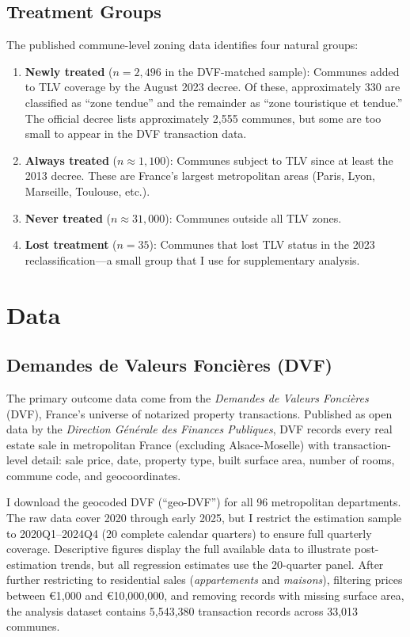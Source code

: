 \documentclass[12pt]{article}
\begin{document}
\subsection{Treatment Groups}

The published commune-level zoning data identifies four natural groups:

\begin{enumerate}
\item \textbf{Newly treated} ($n = 2,496$ in the DVF-matched sample): Communes added to TLV coverage by the August 2023 decree. Of these, approximately 330 are classified as ``zone tendue'' and the remainder as ``zone touristique et tendue.'' The official decree lists approximately 2,555 communes, but some are too small to appear in the DVF transaction data.
\item \textbf{Always treated} ($n \approx 1,100$): Communes subject to TLV since at least the 2013 decree. These are France's largest metropolitan areas (Paris, Lyon, Marseille, Toulouse, etc.).
\item \textbf{Never treated} ($n \approx 31,000$): Communes outside all TLV zones.
\item \textbf{Lost treatment} ($n = 35$): Communes that lost TLV status in the 2023 reclassification---a small group that I use for supplementary analysis.
\end{enumerate}


\section{Data}\label{sec:data}

\subsection{Demandes de Valeurs Fonci\`eres (DVF)}

The primary outcome data come from the \textit{Demandes de Valeurs Fonci\`eres} (DVF), France's universe of notarized property transactions. Published as open data by the \textit{Direction G\'en\'erale des Finances Publiques}, DVF records every real estate sale in metropolitan France (excluding Alsace-Moselle) with transaction-level detail: sale price, date, property type, built surface area, number of rooms, commune code, and geocoordinates.

I download the geocoded DVF (``geo-DVF'') for all 96 metropolitan departments. The raw data cover 2020 through early 2025, but I restrict the estimation sample to 2020Q1--2024Q4 (20 complete calendar quarters) to ensure full quarterly coverage. Descriptive figures display the full available data to illustrate post-estimation trends, but all regression estimates use the 20-quarter panel. After further restricting to residential sales (\textit{appartements} and \textit{maisons}), filtering prices between \euro{1,000} and \euro{10,000,000}, and removing records with missing surface area, the analysis dataset contains 5,543,380 transaction records across 33,013 communes.
\end{document}
